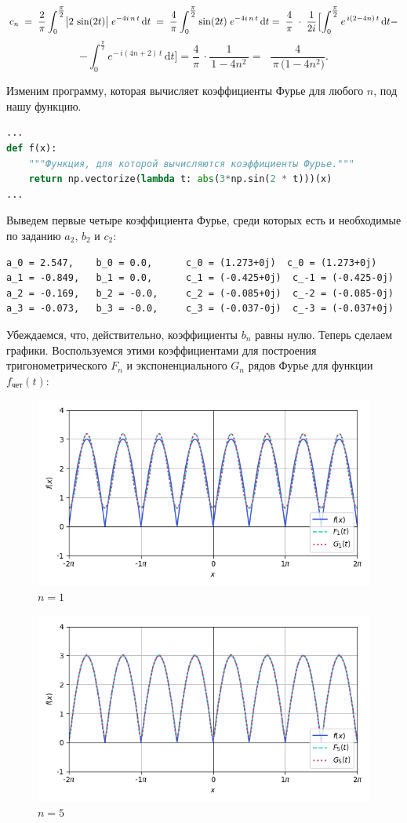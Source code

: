 \documentclass[a4paper]{article}
\begin{document}
$$c_n\;=\; \frac{2}{\pi}\int_{0}^{\tfrac{\pi}{2}}\bigl|2\,\sin(2t)\bigr|\;e^{-4i\,n\,t}\,\mathrm{d}t\;=\; \frac{4}{\pi}\int_{0}^{\tfrac{\pi}{2}}  \sin(2t)\;e^{-4i\,n\,t}\,\mathrm{d}t=\;\frac{4}{\pi}\;\cdot\;\frac{1}{2i}\Bigl[\int_{0}^{\tfrac{\pi}{2}} e^{\,i(2 - 4n)\,t}\,\mathrm{d}t -$$
$$-\int_{0}^{\tfrac{\pi}{2}} e^{-\,i(4n + 2)\,t}\,\mathrm{d}t\Bigr] = \frac{4}{\pi}\,\cdot\frac{1}{\,1 - 4n^2\,}=\;\boxed{\;\frac{4}{\,\pi\,\bigl(1 - 4n^2\bigr)}.}$$



Изменим программу, которая вычисляет коэффициенты Фурье для любого $n$, под нашу функцию.
\begin{lstlisting}[language=Python, caption={Вычисление коэффициентов Фурье для функции $f_\text{чет}(t)$}]
...
def f(x):
    """Функция, для которой вычисляются коэффициенты Фурье."""
    return np.vectorize(lambda t: abs(3*np.sin(2 * t)))(x)
...   
\end{lstlisting}
Выведем первые четыре коэффициента Фурье, среди которых есть и необходимые по заданию $a_2$, $b_2$ и $c_2$:
\begin{lstlisting}[caption=Вывод программы]
a_0 = 2.547,    b_0 = 0.0,      c_0 = (1.273+0j)  c_0 = (1.273+0j)
a_1 = -0.849,   b_1 = 0.0,      c_1 = (-0.425+0j)  c_-1 = (-0.425-0j)
a_2 = -0.169,   b_2 = -0.0,     c_2 = (-0.085+0j)  c_-2 = (-0.085-0j)
a_3 = -0.073,   b_3 = -0.0,     c_3 = (-0.037-0j)  c_-3 = (-0.037+0j)
\end{lstlisting}
Убеждаемся, что, действительно, коэффициенты $b_n$ равны нулю. Теперь сделаем графики. Воспользуемся этими коэффициентами для построения тригонометрического $F_n$ и экспоненциального $G_n$ рядов Фурье для функции $f_\text{чет}(t)$:
\begin{figure}[H]
    \centering
    \includegraphics[width=0.7\linewidth]{even/Im1.png}
    \caption{$n = 1$}
\end{figure}
\begin{figure}[H]
    \centering
    \includegraphics[width=0.7\linewidth]{even/Im5.png}
    \caption{$n = 5$}
\end{figure}
\end{document}
